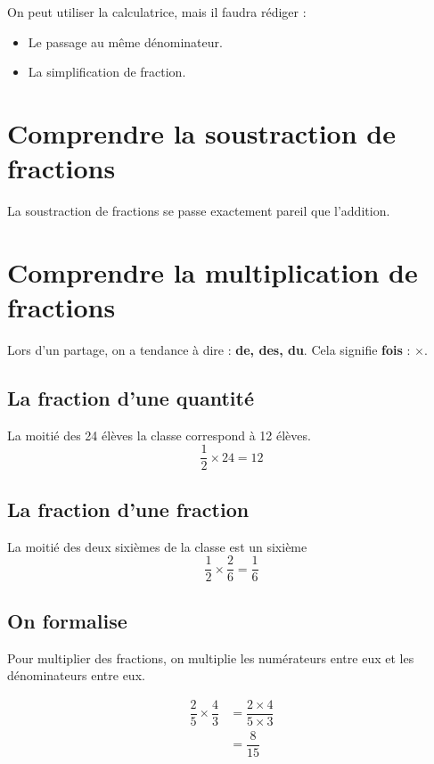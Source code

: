 \documentclass[12pt]{article}
\begin{document}
On peut utiliser la calculatrice, mais il faudra rédiger :

\begin{itemize}
	\item Le passage au même dénominateur.
	\item La simplification de fraction.
\end{itemize}

\newpage

\section*{Comprendre la soustraction de fractions}

La soustraction de fractions se passe exactement pareil que l'addition.

\section*{Comprendre la multiplication de fractions}

Lors d'un partage, on a tendance à dire : \textbf{de, des, du}. Cela signifie \textbf{fois} : $\times$.


\subsection*{La fraction d'une quantité}

La moitié des 24 élèves la classe correspond à 12 élèves. 
$$\dfrac{1}{2} \times 24 = 12$$


\subsection*{La fraction d'une fraction}

La moitié des deux sixièmes de la classe est un sixième
$$\dfrac{1}{2} \times \dfrac{2}{6} = \dfrac{1}{6}$$

\subsection*{On formalise}

Pour multiplier des fractions, on multiplie les numérateurs entre eux et les dénominateurs entre eux.

\begin{align*}
\dfrac{2}{5} \times \dfrac{4}{3} &= \dfrac{2 \times 4}{5 \times 3}  \\
								 &= \dfrac{8}{15}								 
\end{align*}
\end{document}
